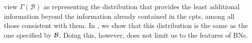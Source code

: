 \documentclass{article}
\newcommand{\MN}{PDG}
\numberwithin{equation}{section}
\begin{document}
\begin{example}[emulating a BN]
view  $\Gamma(\mathcal B)$ as representing the
distribution that provides the least additional
information beyond the information already contained in the
        cpts, among all those consistent with them. In
        , we show that this distribution
        is the same as the one specified by $\cal B$. 
	Doing this, however, does not limit us to the features of BNs. 
	

\end{example}
\end{document}
